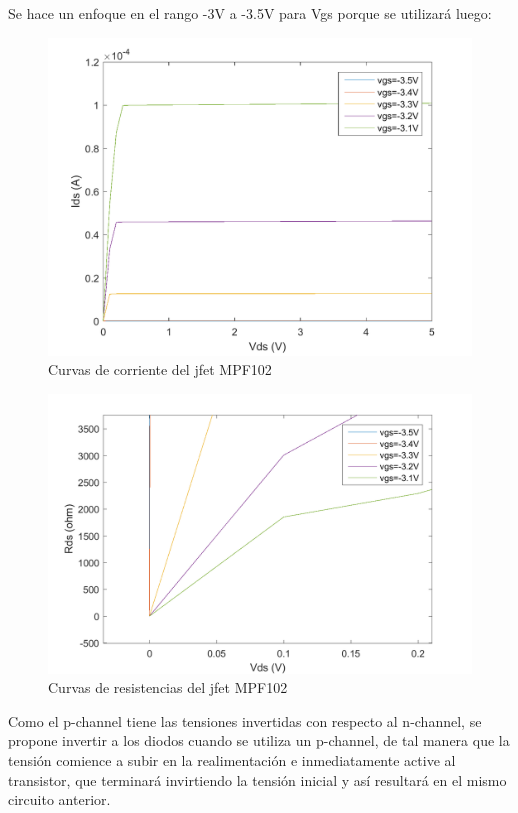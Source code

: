 \documentclass[../../tc_tp6_main.tex]{subfiles}
\begin{document}
Se hace un enfoque en el rango -3V a -3.5V para Vgs porque se utilizará luego: 

\begin{figure}[H]	
	\centering
	\includegraphics[scale=0.4]{imagenes/corrientes_jfet_vgs_bajo.png}
	\caption{Curvas de corriente del jfet MPF102}
	\label{fig:ej1_corrientes_jfet_vgs_bajo}
\end{figure}

\begin{figure}[H]	
	\centering
	\includegraphics[scale=0.45]{imagenes/resistencias_jfet_vgs_bajo.png}
	\caption{Curvas de resistencias del jfet MPF102}
	\label{fig:ej1_resistencias_jfet_vgs_bajo}
\end{figure}

Como el p-channel tiene las tensiones invertidas con respecto al n-channel, se propone invertir a los diodos cuando se utiliza un p-channel, de tal manera que la tensión comience a subir en la realimentación e inmediatamente active al transistor, que terminará invirtiendo la tensión inicial y  así resultará en el mismo circuito anterior.
\end{document}
